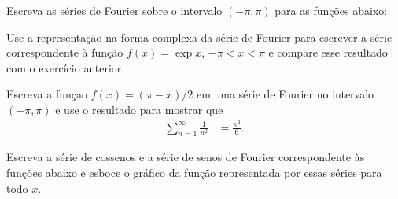 \documentclass[a4paper,12pt, leqno, answers]{exam}
\begin{document}
\begin{questions}
  \question Escreva as séries de Fourier sobre o intervalo $(-\pi, \pi)$ para as funções abaixo:

  \question Use a representação na forma complexa da série de Fourier para escrever a série correspondente à função $f(x) = \exp x$, $-\pi < x < \pi$ e compare esse resultado com o exerc\'{i}cio anterior.
  \begin{solution}
  \end{solution}

  \question Escreva a funçao $f(x) = \left( \pi - x \right) / 2$ em uma série de Fourier no intervalo $(-\pi, \pi)$ e use o resultado para mostrar que 
  \begin{align*}
    \sum_{n = 1}^\infty \frac{1}{n^2} &= \frac{\pi^2}{6}.
  \end{align*}
  \begin{solution}
  \end{solution}

  \question Escreva a série de cossenos e a série de senos de Fourier correspondente às funções abaixo e esboce o gráfico da função representada por essas séries para todo $x$.
\end{questions}
\end{document}
